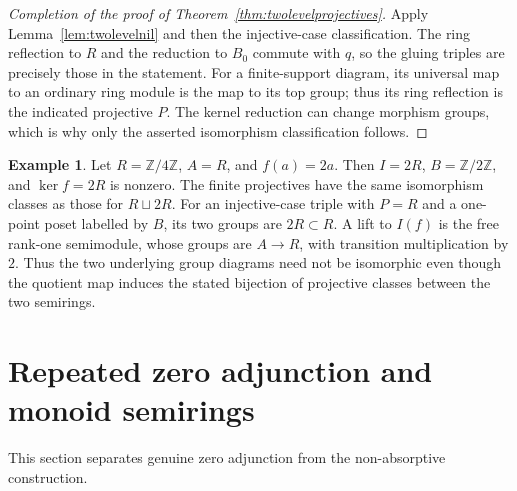 \documentclass[11pt]{amsart}
\newcommand{\Z}{\mathbb Z}
\theoremstyle{definition}
\newtheorem{example}[theorem]{Example}
\theoremstyle{remark}
\begin{document}
\begin{proof}[Completion of the proof of Theorem~\ref{thm:twolevelprojectives}]
Apply Lemma~\ref{lem:twolevelnil} and then the injective-case classification. The ring reflection to $R$ and the reduction to $B_0$ commute with $q$, so the gluing triples are precisely those in the statement. For a finite-support diagram, its universal map to an ordinary ring module is the map to its top group; thus its ring reflection is the indicated projective $P$. The kernel reduction can change morphism groups, which is why only the asserted isomorphism classification follows.
\end{proof}

\begin{example}
Let $R=\Z/4\Z$, $A=R$, and $f(a)=2a$. Then $I=2R$, $B=\Z/2\Z$, and $\ker f=2R$ is nonzero. The finite projectives have the same isomorphism classes as those for $R\sqcup2R$. For an injective-case triple with $P=R$ and a one-point poset labelled by $B$, its two groups are $2R\subset R$. A lift to $I(f)$ is the free rank-one semimodule, whose groups are $A\to R$, with transition multiplication by $2$. Thus the two underlying group diagrams need not be isomorphic even though the quotient map induces the stated bijection of projective classes between the two semirings.
\end{example}

\section{Repeated zero adjunction and monoid semirings}\label{sec:iteration}
This section separates genuine zero adjunction from the non-absorptive construction.
\end{document}
